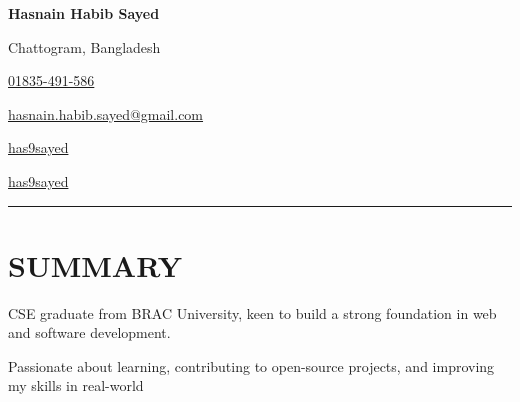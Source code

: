 \documentclass[a4paper,10pt]{article}
\begin{document}
\begin{center}
    \textbf{\Large Hasnain Habib Sayed} \\

    \vspace{0.2em}
    
    Chattogram, Bangladesh \\

    \vspace{0.2em}
    
    \faPhone\hspace{0.5em}\href{tel:01835491586}{01835-491-586} \\
    
    \vspace{0.2em}
    
    \faEnvelope\hspace{0.5em}\href{mailto:hasnain.habib.sayed@gmail.com}{hasnain.habib.sayed@gmail.com} \\

    \vspace{0.2em}
    
    \begin{minipage}[t]{0.135\textwidth}
        \centering
        \faLinkedin\hspace{0.3em}\href{https://linkedin.com/in/has9sayed}{has9sayed}
    \end{minipage}
    \begin{minipage}[t]{0.135\textwidth}
        \centering
        \faGithub\hspace{0.3em}\href{https://github.com/has9sayed}{has9sayed}
    \end{minipage}

\end{center}



\noindent\rule{\textwidth}{0.5pt}

\section*{\normalsize SUMMARY}
CSE graduate from BRAC University, keen to build a strong foundation in web and software development.

\vspace{0.3em}

Passionate about learning, contributing to open-source projects, and improving my skills in real-world

\vspace{0.3em}
\end{document}
